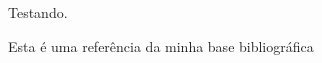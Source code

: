 \documentclass{abnt}
\begin{document}
  Testando.

  Esta é uma referência da minha base bibliográfica\cite{NBR6023:2001}
  
\end{document}

